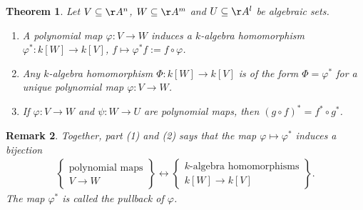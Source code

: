 \documentclass[12pt]{amsart}
\theoremstyle{plain}
\newtheorem{theorem}{Theorem}[subsection]
\newtheorem{remark}[theorem]{Remark}
\begin{document}
\begin{theorem}
Let $V \subseteq \AA^n$, $W \subseteq \AA^m$ and $U \subseteq \AA^l$ be algebraic sets.
\begin{enumerate}
\item
A polynomial map $\varphi:V \to W$ induces a $k$-algebra homomorphism $\varphi^*:k[W] \to k[V]$, $f \mapsto \varphi^*f := f \circ \varphi$.

\item
Any $k$-algebra homomorphism $\Phi:k[W] \to k[V]$ is of the form $\Phi = \varphi^*$ for a unique polynomial map $\varphi : V \to W$.

\item 
If $\varphi : V \to W$ and $\psi : W \to U$ are polynomial maps, then $(g \circ f)^* = f^* \circ g^*$.
\end{enumerate}
\end{theorem}
\begin{remark}
Together, part (1) and (2) says that the map $\varphi \mapsto \varphi^*$ induces a bijection
\begin{align*}\label{polynomialmapkalghombijection}
\left\{
\begin{array}{c}
	\text{polynomial maps} \\
	V \to W
\end{array}
\right\} \longleftrightarrow 
\left\{
\begin{array}{c}
	k\text{-algebra homomorphisms} \\
	k[W] \to k[V]
\end{array}
\right\}.
\end{align*}
The map $\varphi^*$ is called the pullback of $\varphi$.
\end{remark}
\end{document}
